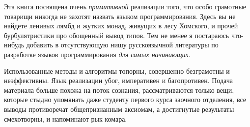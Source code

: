 
Эта книга посвящена очень \emph{примитивной} реализации того, что особо
грамотные товарищи никогда не захотят назвать языком программирования. Здесь вы
не найдете ленивых лямбд и жутких монад, живущих в лесу Хомского, и прочей
бурбулятристики про обощенный вывод типов. Тем не менее я постараюсь что-нибудь
добавить в отсутствующую нишу русскоязычной литературы по разработке языков
программирования \emph{для самых начинающих}.

Использованные методы и алгоритмы топорны, совершенно безграмотны и 
неэффективны. Язык реализации убог, императивен и багопротивен. Подача материала
больше похожа на поток сознания, рассматриваются только вещи, которые стыдно
упомянать даже студенту первого курса заочного отделения, все выводы
противоречат общепризнанным аксиомам, а достигнутые результаты смехотворны, и
напоминают рык комара.

